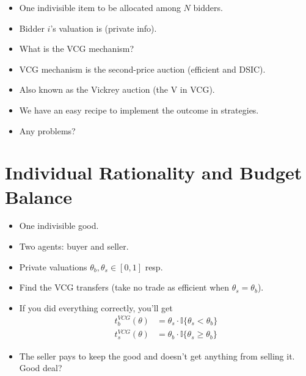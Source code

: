 \documentclass[english,handout,10pt]{beamer}		%
\def\lyxframeend{} %
\begin{document}
\begin{example}[Auction]
	\begin{itemize}
		\item One indivisible item to be allocated among $N$ bidders.
		\item Bidder $i$'s valuation is  (private info).
		\item What is the VCG mechanism?
	\end{itemize}
\end{example}
\pause
\begin{itemize}
	\item VCG mechanism is the second-price auction (efficient and DSIC).
	\item Also known as the Vickrey auction (the V in VCG).
\end{itemize}
\lyxframeend


\begin{itemize}
	\item We have an easy recipe to implement the  outcome in  strategies.
	\item Any problems?
\end{itemize}
\lyxframeend



\section{Individual Rationality and Budget Balance}

\begin{example}
	\begin{itemize}
		\item One indivisible good.
		\item Two agents: buyer and seller. 
		\item Private valuations $\theta_b,\theta_s \in [0,1]$ resp.
		\item Find the VCG transfers (take no trade as efficient when $\theta_s = \theta_b$).
	\end{itemize}
\end{example}
\lyxframeend


\begin{itemize}
	\item If you did everything correctly, you'll get
	\begin{align*}
	t_b^{VCG}(\theta) &= \theta_s \cdot \mathbb{I} \{ \theta_s < \theta_b \} 
	\\ t_s^{VCG}(\theta) &= \theta_b \cdot \mathbb{I} \{ \theta_s \geq \theta_b \} 
	\end{align*}
	\pause
	\item The seller pays to keep the good and doesn't get anything from selling it. Good deal?
\end{itemize}
\lyxframeend
\end{document}
